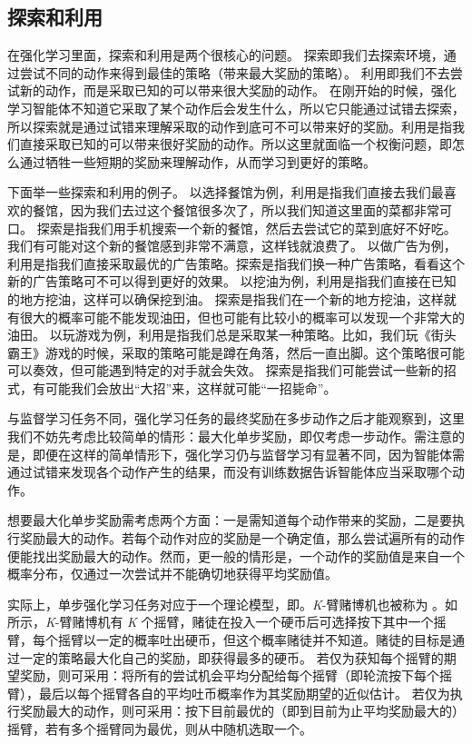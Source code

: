 \subsection{探索和利用} 

在强化学习里面，探索和利用是两个很核心的问题。
探索即我们去探索环境，通过尝试不同的动作来得到最佳的策略（带来最大奖励的策略）。
利用即我们不去尝试新的动作，而是采取已知的可以带来很大奖励的动作。
在刚开始的时候，强化学习智能体不知道它采取了某个动作后会发生什么，所以它只能通过试错去探索，所以探索就是通过试错来理解采取的动作到底可不可以带来好的奖励。利用是指我们直接采取已知的可以带来很好奖励的动作。所以这里就面临一个权衡问题，即怎么通过牺牲一些短期的奖励来理解动作，从而学习到更好的策略。

下面举一些探索和利用的例子。
以选择餐馆为例，利用是指我们直接去我们最喜欢的餐馆，因为我们去过这个餐馆很多次了，所以我们知道这里面的菜都非常可口。
探索是指我们用手机搜索一个新的餐馆，然后去尝试它的菜到底好不好吃。我们有可能对这个新的餐馆感到非常不满意，这样钱就浪费了。
以做广告为例，利用是指我们直接采取最优的广告策略。探索是指我们换一种广告策略，看看这个新的广告策略可不可以得到更好的效果。
以挖油为例，利用是指我们直接在已知的地方挖油，这样可以确保挖到油。
探索是指我们在一个新的地方挖油，这样就有很大的概率可能不能发现油田，但也可能有比较小的概率可以发现一个非常大的油田。
以玩游戏为例，利用是指我们总是采取某一种策略。比如，我们玩《街头霸王》游戏的时候，采取的策略可能是蹲在角落，然后一直出脚。这个策略很可能可以奏效，但可能遇到特定的对手就会失效。
探索是指我们可能尝试一些新的招式，有可能我们会放出“大招”来，这样就可能“一招毙命”。

与监督学习任务不同，强化学习任务的最终奖励在多步动作之后才能观察到，这里我们不妨先考虑比较简单的情形：最大化单步奖励，即仅考虑一步动作。需注意的是，即便在这样的简单情形下，强化学习仍与监督学习有显著不同，因为智能体需通过试错来发现各个动作产生的结果，而没有训练数据告诉智能体应当采取哪个动作。

想要最大化单步奖励需考虑两个方面：一是需知道每个动作带来的奖励，二是要执行奖励最大的动作。若每个动作对应的奖励是一个确定值，那么尝试遍所有的动作便能找出奖励最大的动作。然而，更一般的情形是，一个动作的奖励值是来自一个概率分布，仅通过一次尝试并不能确切地获得平均奖励值。

实际上，单步强化学习任务对应于一个理论模型，即。\textit{K}-臂赌博机也被称为 。如 所示，\textit{K}-臂赌博机有 \textit{K} 个摇臂，赌徒在投入一个硬币后可选择按下其中一个摇臂，每个摇臂以一定的概率吐出硬币，但这个概率赌徒并不知道。赌徒的目标是通过一定的策略最大化自己的奖励，即获得最多的硬币。
若仅为获知每个摇臂的期望奖励，则可采用：将所有的尝试机会平均分配给每个摇臂（即轮流按下每个摇臂），最后以每个摇臂各自的平均吐币概率作为其奖励期望的近似估计。
若仅为执行奖励最大的动作，则可采用：按下目前最优的（即到目前为止平均奖励最大的）摇臂，若有多个摇臂同为最优，则从中随机选取一个。

